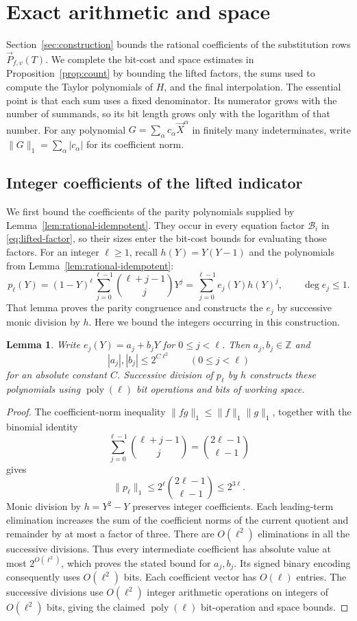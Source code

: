 \documentclass[11pt,reqno]{amsart}
\numberwithin{equation}{section}
\newtheorem{lemma}[theorem]{Lemma}
\theoremstyle{definition}\newtheorem{definition}[theorem]{Definition}
\theoremstyle{remark}\newtheorem{remark}[theorem]{Remark}
\newcommand{\poly}{\operatorname{poly}}
\renewcommand{\le}{\leqslant}
\renewcommand{\ge}{\geqslant}
\begin{document}
\section{Exact arithmetic and space}\label{app:arithmetic}
Section~\ref{sec:construction} bounds the rational coefficients of the
substitution rows $\vec{P}_{f,v}(T)$. We complete the bit-cost and space
estimates in Proposition~\ref{prop:count} by bounding the lifted factors,
the sums used to compute the Taylor polynomials of $H$, and the final
interpolation. The essential point is that each sum uses a fixed
denominator. Its numerator grows with the number of summands, so its
bit length grows only with the logarithm of that number.
For any polynomial $G=\sum_\alpha c_\alpha \vec{X}^{\alpha}$ in finitely
many indeterminates, write $\|G\|_1=\sum_\alpha|c_\alpha|$ for its
coefficient norm.

\subsection{Integer coefficients of the lifted indicator}
\label{subsec:rational-lift-height}
We first bound the coefficients of the parity polynomials supplied
by Lemma~\ref{lem:rational-idempotent}. They occur in every equation
factor $\mathcal B_i$ in \eqref{eq:lifted-factor}, so their sizes
enter the bit-cost bounds for evaluating those factors.
For an integer $\ell\ge1$, recall $h(Y)=Y(Y-1)$ and the polynomials
from Lemma~\ref{lem:rational-idempotent}:
\[
 p_\ell(Y)=(1-Y)^\ell\sum_{j=0}^{\ell-1}
                    \binom{\ell+j-1}{j}Y^j
          =\sum_{j=0}^{\ell-1}e_j(Y)h(Y)^j,
 \qquad \deg e_j\le1.
\]
That lemma proves the parity congruence and constructs the $e_j$ by
successive monic division by $h$. Here we bound the integers occurring
in this construction.

\begin{lemma}\label{lem:rational-lift-height}
Write $e_j(Y)=a_j+b_jY$ for $0\le j<\ell$. Then $a_j,b_j\in\mathbb Z$ and
\[
 |a_j|,|b_j|\le2^{C\ell^2}\qquad(0\le j<\ell)
\]
for an absolute constant $C$.
Successive division of $p_\ell$ by $h$ constructs these polynomials
using $\poly(\ell)$ bit operations and bits of working space.
\end{lemma}
\begin{proof}
The coefficient-norm inequality
$\|fg\|_1\le\|f\|_1\|g\|_1$, together with the binomial identity
\[
 \sum_{j=0}^{\ell-1}\binom{\ell+j-1}{j}
 =\binom{2\ell-1}{\ell-1}
\]
gives
\[
 \|p_\ell\|_1\le2^\ell\binom{2\ell-1}{\ell-1}\le2^{3\ell}.
\]
Monic division by $h=Y^2-Y$ preserves integer coefficients. Each
leading-term elimination increases the sum of the coefficient norms
of the current quotient and remainder by at most a factor of three.
There are $O(\ell^2)$ eliminations in all the successive divisions.
Thus every intermediate coefficient has absolute value at most
$2^{O(\ell^2)}$, which proves the stated bound for $a_j,b_j$.
Its signed binary encoding consequently uses $O(\ell^2)$ bits.
Each coefficient vector has $O(\ell)$
entries. The successive divisions use $O(\ell^2)$ integer arithmetic
operations on integers of $O(\ell^2)$ bits, giving the claimed
$\poly(\ell)$ bit-operation and space bounds.
\end{proof}
\end{document}
